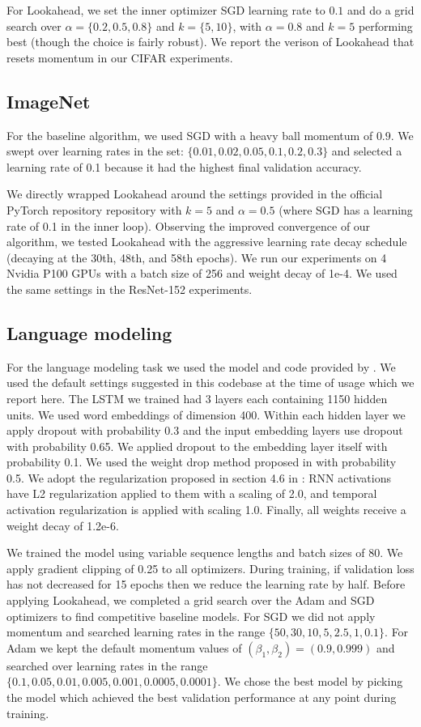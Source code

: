 For Lookahead, we set the inner optimizer SGD learning rate to $0.1$ and do a grid search over $\alpha = \{0.2, 0.5, 0.8\}$ and $k = \{5, 10\}$, with $\alpha=0.8$ and $k=5$ performing best (though the choice is fairly robust). We report the verison of Lookahead that resets momentum in our CIFAR experiments. 

\subsection{ImageNet}
For the baseline algorithm, we used SGD with a heavy ball momentum of $0.9$. We swept over learning rates in the set: $\{0.01, 0.02, 0.05, 0.1, 0.2, 0.3\}$ and selected a learning rate of 0.1 because it had the highest final validation accuracy.

We directly wrapped Lookahead around the settings provided in the official PyTorch repository repository with $k =5$ and $\alpha=0.5$ (where SGD has a learning rate of 0.1 in the inner loop). Observing the improved convergence of our algorithm, we tested Lookahead with the aggressive learning rate decay schedule (decaying at the 30th, 48th, and 58th epochs). We run our experiments on 4 Nvidia P100 GPUs with a batch size of 256 and weight decay of 1e-4. We used the same settings in the ResNet-152 experiments. 

\subsection{Language modeling}

For the language modeling task we used the model and code provided by \citet{merity2017regularizing}. We used the default settings suggested in this codebase at the time of usage which we report here. The LSTM we trained had 3 layers each containing 1150 hidden units. We used word embeddings of dimension 400.  Within each hidden layer we apply dropout with probability 0.3 and the input embedding layers use dropout with probability 0.65. We applied dropout to the embedding layer itself with probability 0.1. We used the weight drop method proposed in \citet{merity2017regularizing} with probability 0.5. We adopt the regularization proposed in section 4.6 in \citet{merity2017regularizing}: RNN activations have L2 regularization applied to them with a scaling of 2.0, and temporal activation regularization is applied with scaling 1.0. Finally, all weights receive a weight decay of 1.2e-6.

We trained the model using variable sequence lengths and batch sizes of 80. We apply gradient clipping of 0.25 to all optimizers. During training, if validation loss has not decreased for 15 epochs then we reduce the learning rate by half.  Before applying Lookahead, we completed a grid search over the Adam and SGD optimizers to find competitive baseline models. For SGD we did not apply momentum and searched learning rates in the range $\{50, 30, 10, 5, 2.5, 1, 0.1\}$. For Adam we kept the default momentum values of $(\beta_1, \beta_2) = (0.9, 0.999)$ and searched over learning rates in the range $\{0.1, 0.05, 0.01, 0.005, 0.001, 0.0005, 0.0001\}$. We chose the best model by picking the model which achieved the best validation performance at any point during training.

